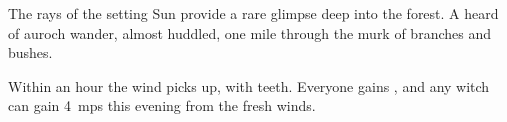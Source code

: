 \begin{boxtext}
  The rays of the setting Sun provide a rare glimpse deep into the forest.
  A heard of auroch wander, almost huddled, one mile through the murk of branches and bushes.
\end{boxtext}

Within an hour the wind picks up, with teeth.
Everyone gains , and any \gls{witch} can gain 4~\glspl{mp} this evening from the fresh winds.
